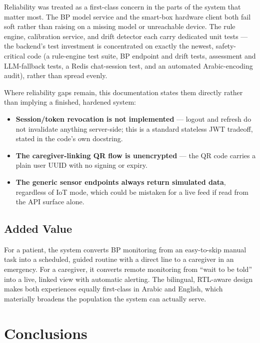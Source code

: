 \documentclass[12pt,a4paper]{report}
\begin{document}
Reliability was treated as a first-class concern in the parts of the system that
matter most. The BP model service and the smart-box hardware client both fail
soft rather than raising on a missing model or unreachable device. The rule
engine, calibration service, and drift detector each carry dedicated unit tests
--- the backend's test investment is concentrated on exactly the newest,
safety-critical code (a rule-engine test suite, BP endpoint and drift tests,
assessment and LLM-fallback tests, a Redis chat-session test, and an automated
Arabic-encoding audit), rather than spread evenly.

Where reliability gaps remain, this documentation states them directly rather
than implying a finished, hardened system:

\begin{itemize}[leftmargin=1.4em]
  \item \textbf{Session/token revocation is not implemented} --- logout and
  refresh do not invalidate anything server-side; this is a standard stateless
  JWT tradeoff, stated in the code's own docstring.
  \item \textbf{The caregiver-linking QR flow is unencrypted} --- the QR code
  carries a plain user UUID with no signing or expiry.
  \item \textbf{The generic sensor endpoints always return simulated data},
  regardless of IoT mode, which could be mistaken for a live feed if read from
  the API surface alone.
\end{itemize}

\section{Added Value}

For a patient, the system converts BP monitoring from an easy-to-skip manual
task into a scheduled, guided routine with a direct line to a caregiver in an
emergency. For a caregiver, it converts remote monitoring from ``wait to be
told'' into a live, linked view with automatic alerting. The bilingual,
RTL-aware design makes both experiences equally first-class in Arabic and
English, which materially broadens the population the system can actually serve.

\chapter{Conclusions}\label{sec:conclusion}
\end{document}
